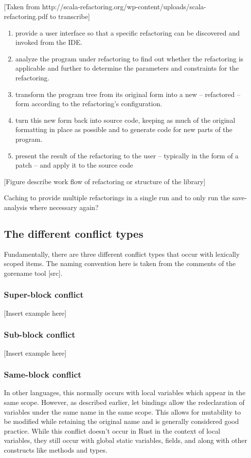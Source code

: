 \subsection{}
[Taken from http://scala-refactoring.org/wp-content/uploads/scala-refactoring.pdf to transcribe]
\begin{enumerate}
\item provide a user interface so that a specific refactoring can be discovered and
invoked from the IDE.
\item analyze the program under refactoring to find out whether the refactoring is
applicable  and  further  to  determine  the  parameters  and  constraints  for  the
refactoring.
\item transform the program tree from its original form into a new – refactored – form
according to the refactoring’s configuration.
\item turn this new form back into source code,  keeping as much of the original
formatting in place as possible and to generate code for new parts of the program.
\item present the result of the refactoring to the user – typically in the form of a patch –
and apply it to the source code
\end{enumerate}

[Figure describe work flow of refactoring or structure of the library]

Caching to provide multiple refactorings in a single run and to only run the save-analysis where necessary again?

\subsection{The different conflict types}
Fundamentally, there are three different conflict types that occur with lexically scoped items. The naming convention here is taken from the comments of the gorename tool [src].

\subsubsection{Super-block conflict}
[Insert example here]

\subsubsection{Sub-block conflict}
[Insert example here]

\subsubsection{Same-block conflict}
In other languages, this normally occurs with local variables which appear in the same scope. However, as described earlier, let bindings allow the redeclaration of variables under the same name in the same scope. This allows for mutability to be modified while retaining the original name and is generally considered good practice. While this conflict doesn't occur in Rust in the context of local variables, they still occur with global static variables, fields, and along with other constructs like methods and types.

